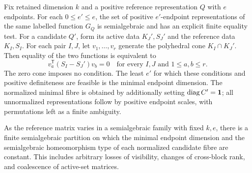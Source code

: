 \begin{theorem}\label{thm:all-strata}
Fix retained dimension $k$ and a positive reference representation $Q$ with $e$ endpoints. For each $0\le e'\le e$, the set of positive $e'$-endpoint representations of the same labelled function $G_Q$ is semialgebraic and has an explicit finite equality test. For a candidate $Q'$, form its active data $K_J',S_J'$ and the reference data $K_I,S_I$. For each pair $I,J$, let $v_1,\ldots,v_r$ generate the polyhedral cone $K_I\cap K_J'$. Then equality of the two functions is equivalent to
\begin{equation}\label{eq:all-strata-test}
 v_a^{\mathsf T}(S_I-S_J')v_b=0
 \quad\text{for every }I,J\text{ and }1\le a,b\le r.
\end{equation}
The zero cone imposes no condition. The least $e'$ for which these conditions and positive definiteness are feasible is the minimal endpoint dimension. The normalized minimal fibre is obtained by additionally setting $\operatorname{diag} C'=\mathbf1$; all unnormalized representations follow by positive endpoint scales, with permutations left as a finite ambiguity.

As the reference matrix varies in a semialgebraic family with fixed $k,e$, there is a finite semialgebraic partition on which the minimal endpoint dimension and the semialgebraic homeomorphism type of each normalized candidate fibre are constant. This includes arbitrary losses of visibility, changes of cross-block rank, and coalescence of active-set matrices.
\end{theorem}
